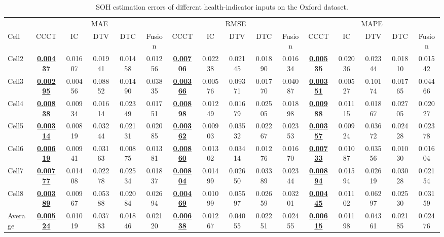 \begin{table}[!htb]
\TableStyle
\fontsize{7pt}{9pt}\selectfont
\setlength{\tabcolsep}{0.8pt}
\renewcommand{\arraystretch}{1.18}
\caption{SOH estimation errors of different health-indicator inputs on the Oxford dataset.}
\label{tab:4-hi-input}
\begin{tabular*}{\linewidth}{@{\extracolsep{\fill}}l*{15}{c}@{}}
\toprule
& \multicolumn{5}{c}{MAE}
& \multicolumn{5}{c}{RMSE}
& \multicolumn{5}{c}{MAPE} \\
\cmidrule(lr){2-6}\cmidrule(lr){7-11}\cmidrule(lr){12-16}
Cell
& CCCT & IC & DTV & DTC & Fusion
& CCCT & IC & DTV & DTC & Fusion
& CCCT & IC & DTV & DTC & Fusion \\
\midrule
Cell2
& \textbf{\underline{0.00437}} & 0.01607 & 0.01941 & 0.01458 & 0.01256
& \textbf{\underline{0.00706}} & 0.02238 & 0.02145 & 0.01890 & 0.01634
& \textbf{\underline{0.00535}} & 0.02036 & 0.02344 & 0.01810 & 0.01542 \\
Cell3
& \textbf{\underline{0.00295}} & 0.00456 & 0.08852 & 0.01490 & 0.03835
& \textbf{\underline{0.00366}} & 0.00576 & 0.09371 & 0.01770 & 0.04087
& \textbf{\underline{0.00351}} & 0.00527 & 0.10174 & 0.01765 & 0.04466 \\
Cell4
& \textbf{\underline{0.00838}} & 0.00934 & 0.01614 & 0.02349 & 0.01751
& \textbf{\underline{0.00898}} & 0.01249 & 0.01679 & 0.02505 & 0.01898
& \textbf{\underline{0.00988}} & 0.01115 & 0.01867 & 0.02705 & 0.02027 \\
Cell5
& \textbf{\underline{0.00314}} & 0.00819 & 0.03244 & 0.02131 & 0.02085
& \textbf{\underline{0.00362}} & 0.00903 & 0.03532 & 0.02267 & 0.02353
& \textbf{\underline{0.00357}} & 0.00924 & 0.03672 & 0.02428 & 0.02378 \\
Cell6
& \textbf{\underline{0.00619}} & 0.00941 & 0.03163 & 0.00875 & 0.01381
& \textbf{\underline{0.00860}} & 0.01302 & 0.03414 & 0.01276 & 0.01670
& \textbf{\underline{0.00733}} & 0.01087 & 0.03556 & 0.01030 & 0.01604 \\
Cell7
& \textbf{\underline{0.00777}} & 0.01408 & 0.02278 & 0.02534 & 0.01837
& \textbf{\underline{0.00804}} & 0.01499 & 0.02650 & 0.03389 & 0.02344
& \textbf{\underline{0.00894}} & 0.01594 & 0.02619 & 0.03028 & 0.02154 \\
Cell8
& \textbf{\underline{0.00389}} & 0.00967 & 0.05388 & 0.02084 & 0.02694
& \textbf{\underline{0.00469}} & 0.01099 & 0.05597 & 0.02659 & 0.03201
& \textbf{\underline{0.00445}} & 0.01102 & 0.06297 & 0.02530 & 0.03159 \\
\addlinespace[2pt]
Average
& \textbf{\underline{0.00524}} & 0.01019 & 0.03783 & 0.01846 & 0.02120
& \textbf{\underline{0.00638}} & 0.01267 & 0.04055 & 0.02251 & 0.02455
& \textbf{\underline{0.00615}} & 0.01198 & 0.04361 & 0.02185 & 0.02476 \\
\bottomrule
\end{tabular*}
\end{table}
